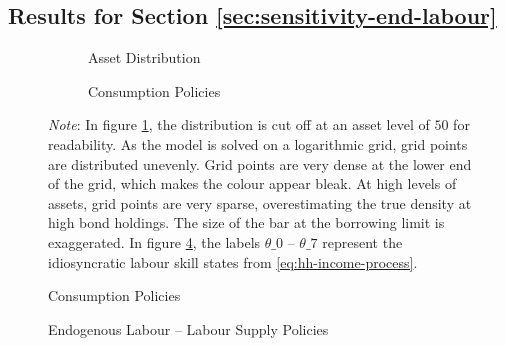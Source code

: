 \documentclass[a4paper,12pt]{article} %
\numberwithin{equation}{section} %
\numberwithin{figure}{section}
\numberwithin{table}{section}
\begin{document}
\begin{refsection}
\begin{appendices}
\subsection{Results for Section \ref{sec:sensitivity-end-labour}}
\label{sec-app:figures-end-L}

\begin{figure}[H]
    \caption{Endogenous Labour -- The Initial Steady State}
    \label{fig:init-stst-end-L}
    \centering
    \begin{subfigure}[b]{0.49\textwidth}
    \caption{Asset Distribution}
    \label{fig:init-stst-end-L-dist}
         \centering
         
     \end{subfigure}
     \hfill
     \begin{subfigure}[b]{0.49\textwidth}
     \caption{Consumption Policies}
     \label{fig:init-stst-end-L-pol-c}
         \centering
         
     \end{subfigure}

    \vspace{10pt}
     
     \justifying
     \footnotesize
	\textit{Note}: In figure \ref{fig:init-stst-end-L-dist}, the distribution is cut off at an asset level of $50$ for readability. As the model is solved on a logarithmic grid, grid points are distributed unevenly. Grid points are very dense at the lower end of the grid, which makes the colour appear bleak. At high levels of assets, grid points are very sparse, overestimating the true density at high bond holdings. The size of the bar at the borrowing limit is exaggerated. In figure \ref{fig:init-stst-end-L-pol-n}, the labels $\theta\_0$ -- $\theta\_7$ represent the idiosyncratic labour skill states from \eqref{eq:hh-income-process}.
\end{figure}

\begin{figure}[H]
    \centering
    \caption{Endogenous Labour -- Labour Supply Policies}
    \label{fig:init-stst-end-L-pol-n}
    

    \vspace{10pt}
    

\end{figure}
\end{appendices}
\end{refsection}
\end{document}
